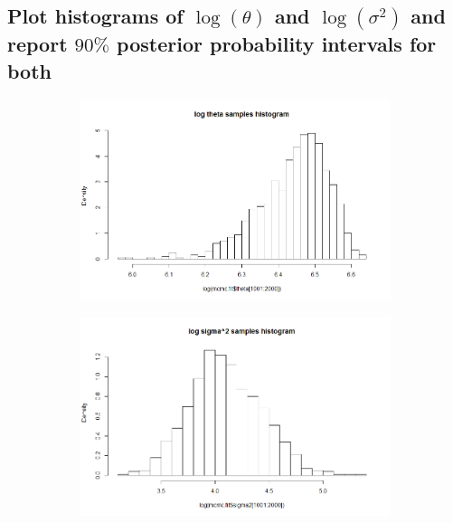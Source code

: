 \documentclass[20pt]{article} %
\begin{document}
\subsection{Plot histograms of $\log(\theta)$ and $\log(\sigma^{2})$ and report $90\%$ posterior probability intervals for both}
\begin{figure}[!htbp]
  	\centering
   	\begin{subfigure}[p]{0.7\linewidth}
    	\includegraphics[width=\linewidth]{../figures/midterm2.png}
   	\end{subfigure}
\end{figure} 
\begin{figure}[!htbp]
  	\centering
   	\begin{subfigure}[p]{0.7\linewidth}
    	\includegraphics[width=\linewidth]{../figures/midterm3.png}
   	\end{subfigure}
\end{figure} 
\end{document}
